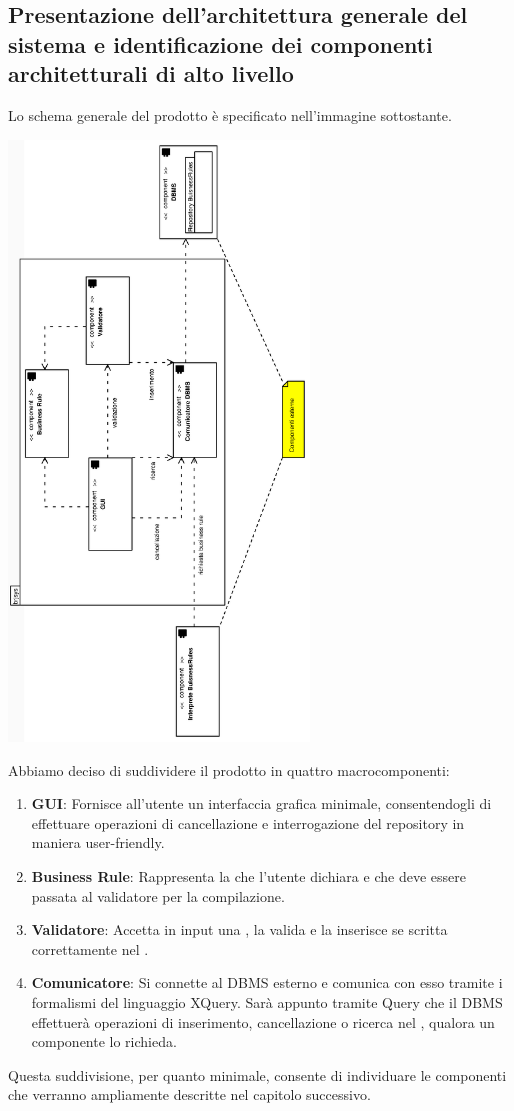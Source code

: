 \documentclass[11pt,titlepage,a4paper]{report}
\begin{document}
\subsection{Presentazione dell'architettura generale del sistema e identificazione dei componenti architetturali di alto livello}
Lo schema generale del prodotto \`e specificato nell'immagine sottostante.
\begin{center}
\includegraphics[width=0.6\textwidth, angle=-90]{DiagrammaClassi/schemagenerale.eps}
\end{center}
Abbiamo deciso di suddividere il prodotto in quattro macrocomponenti:
\begin{enumerate}
 \item \textbf{GUI}: Fornisce all'utente un interfaccia grafica minimale, consentendogli di effettuare operazioni di cancellazione e interrogazione del repository in maniera user-friendly.
\item \textbf{Business Rule}: Rappresenta la \br che l'utente dichiara e che deve essere passata al validatore per la compilazione.
\item \textbf{Validatore}: Accetta in input una \br, la valida e la inserisce se scritta correttamente nel \re.
\item \textbf{Comunicatore}: Si connette al DBMS esterno e comunica con esso tramite i formalismi del linguaggio XQuery.
Sar\`a appunto tramite Query che il DBMS effettuer\`a operazioni di inserimento, cancellazione o ricerca nel \re, qualora un componente lo richieda.
\end{enumerate}
Questa suddivisione, per quanto minimale, consente di individuare le componenti che verranno ampliamente descritte nel capitolo successivo.
\end{document}

